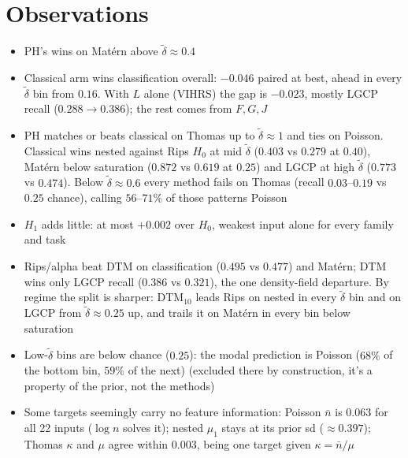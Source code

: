 \documentclass[11pt]{article}
\newcommand{\dt}{\tilde\delta}
\newcommand{\nb}{\bar n}
\begin{document}
\section{Observations}

\begin{itemize}
  \item PH's wins on Mat\'ern above $\dt\approx0.4$
  \item Classical arm wins classification overall: $-0.046$ paired at best, ahead in every $\dt$ bin from $0.16$. With $L$ alone (VIHRS) the gap is $-0.023$, mostly LGCP recall ($0.288\to0.386$); the rest comes from $F,G,J$
  \item PH matches or beats classical on Thomas up to $\dt\approx1$ and ties on Poisson. Classical wins nested against Rips $H_0$ at mid $\dt$ ($0.403$ vs $0.279$ at $0.40$), Mat\'ern below saturation ($0.872$ vs $0.619$ at $0.25$) and LGCP at high $\dt$ ($0.773$ vs $0.474$). Below $\dt\approx0.6$ every method fails on Thomas (recall $0.03$--$0.19$ vs $0.25$ chance), calling $56$--$71\%$ of those patterns Poisson
  \item $H_1$ adds little: at most $+0.002$ over $H_0$, weakest input alone for every family and task
  \item Rips/alpha beat DTM on classification ($0.495$ vs $0.477$) and Mat\'ern; DTM wins only LGCP recall ($0.386$ vs $0.321$), the one density-field departure.
  By regime the split is sharper: DTM$_{10}$ leads Rips on nested in every $\dt$ bin and on LGCP from $\dt\approx0.25$ up, and trails it on Mat\'ern in every bin below saturation
  \item Low-$\dt$ bins are below chance ($0.25$): the modal prediction is Poisson ($68\%$ of the bottom bin, $59\%$ of the next) (excluded there by construction, it's a property of the prior, not the methods)
  \item Some targets seemingly carry no feature information: Poisson $\nb$ is $0.063$ for all 22 inputs ($\log n$ solves it); nested $\mu_1$ stays at its prior sd ($\approx0.397$); Thomas $\kappa$ and $\mu$ agree within $0.003$, being one target given $\kappa=\nb/\mu$
\end{itemize}
\end{document}
